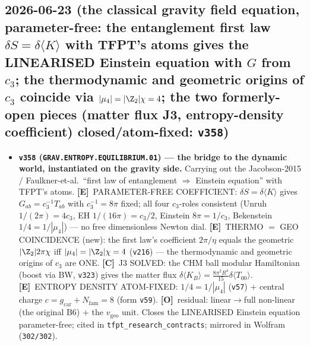 \documentclass[11pt]{article}
\providecommand{\mE}{\textbf{[E]}}\providecommand{\mC}{\textbf{[C]}}
\providecommand{\mO}{\textbf{[O]}}\providecommand{\mX}{\textbf{[X]}}
\providecommand{\vref}[1]{\texttt{#1}}
\providecommand{\cthree}{c_3}\providecommand{\phiz}{\varphi_0^{\mathrm{ret}}}
\providecommand{\gcar}{g_{\mathrm{car}}}\providecommand{\Nfam}{N_{\mathrm{fam}}}
\begin{document}
\subsection*{2026-06-23 (the classical gravity field equation, parameter-free: the entanglement first law $\delta S=\delta\langle K\rangle$ with TFPT's atoms gives the LINEARISED Einstein equation with $G$ from $\cthree$; the thermodynamic and geometric origins of $\cthree$ coincide via $|\mu_4|=|\Z_2|\chi=4$; the two formerly-open pieces (matter flux J3, entropy-density coefficient) closed/atom-fixed: \texttt{v358})}
\begin{itemize}
\item \textbf{\texttt{v358} (\texttt{GRAV.ENTROPY.EQUILIBRIUM.01}) --- the bridge to the dynamic world, instantiated on the
gravity side.} Carrying out the Jacobson-2015 / Faulkner-et-al.\ ``first law of entanglement $\Rightarrow$ Einstein
equation'' with TFPT's atoms. \mE\ PARAMETER-FREE COEFFICIENT: $\delta S=\delta\langle K\rangle$ gives
$G_{ab}=\cthree^{-1}T_{ab}$ with $\cthree^{-1}=8\pi$ fixed; all four $\cthree$-roles consistent (Unruh
$1/(2\pi){=}4\cthree$, EH $1/(16\pi){=}\cthree/2$, Einstein $8\pi{=}1/\cthree$, Bekenstein $1/4{=}1/|\mu_4|$) ---
no free dimensionless Newton dial. \mE\ THERMO $=$ GEO COINCIDENCE (new): the first law's coefficient $2\pi/\eta$
equals the geometric $|\Z_2|2\pi\chi$ iff $|\mu_4|=|\Z_2|\chi=4$ (\vref{v216}) --- the thermodynamic and geometric
origins of $\cthree$ are ONE. \mC\ J3 SOLVED: the CHM ball modular Hamiltonian (boost via BW, \vref{v323}) gives the
matter flux $\delta\langle K_B\rangle=\tfrac{8\pi^2R^4}{15}\delta\langle T_{00}\rangle$. \mE\ ENTROPY DENSITY
ATOM-FIXED: $1/4{=}1/|\mu_4|$ (\vref{v57}) $+$ central charge $c=\gcar{+}\Nfam=8$ (form \vref{v59}). \mO\ residual:
linear$\to$full non-linear (the original B6) $+$ the $v_{\mathrm{geo}}$ unit. Closes the LINEARISED Einstein
equation parameter-free; cited in \texttt{tfpt\_research\_contracts}; mirrored in Wolfram (\texttt{302/302}).
\end{itemize}
\end{document}
